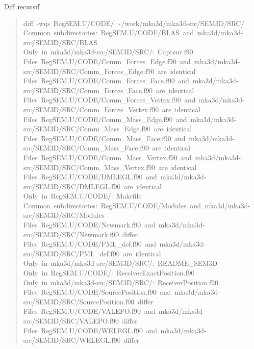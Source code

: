\documentclass[10pt,a4paper,english]{article}
\begin{document}
Diff recursif
\begin{quote}{\ttfamily \raggedright \noindent
diff~-wqs~RegSEM.U/CODE/~{\textasciitilde}/work/mka3d/mka3d-src/SEM3D/SRC/~\\
Common~subdirectories:~RegSEM.U/CODE/BLAS~and~mka3d/mka3d-src/SEM3D/SRC/BLAS~\\
Only~in~mka3d/mka3d-src/SEM3D/SRC/:~Capteur.f90~\\
Files~RegSEM.U/CODE/Comm{\_}Forces{\_}Edge.f90~and~mka3d/mka3d-src/SEM3D/SRC/Comm{\_}Forces{\_}Edge.f90~are~identical~\\
Files~RegSEM.U/CODE/Comm{\_}Forces{\_}Face.f90~and~mka3d/mka3d-src/SEM3D/SRC/Comm{\_}Forces{\_}Face.f90~are~identical~\\
Files~RegSEM.U/CODE/Comm{\_}Forces{\_}Vertex.f90~and~mka3d/mka3d-src/SEM3D/SRC/Comm{\_}Forces{\_}Vertex.f90~are~identical~\\
Files~RegSEM.U/CODE/Comm{\_}Mass{\_}Edge.f90~and~mka3d/mka3d-src/SEM3D/SRC/Comm{\_}Mass{\_}Edge.f90~are~identical~\\
Files~RegSEM.U/CODE/Comm{\_}Mass{\_}Face.f90~and~mka3d/mka3d-src/SEM3D/SRC/Comm{\_}Mass{\_}Face.f90~are~identical~\\
Files~RegSEM.U/CODE/Comm{\_}Mass{\_}Vertex.f90~and~mka3d/mka3d-src/SEM3D/SRC/Comm{\_}Mass{\_}Vertex.f90~are~identical~\\
Files~RegSEM.U/CODE/DMLEGL.f90~and~mka3d/mka3d-src/SEM3D/SRC/DMLEGL.f90~are~identical~\\
Only~in~RegSEM.U/CODE/:~Makefile~\\
Common~subdirectories:~RegSEM.U/CODE/Modules~and~mka3d/mka3d-src/SEM3D/SRC/Modules~\\
Files~RegSEM.U/CODE/Newmark.f90~and~mka3d/mka3d-src/SEM3D/SRC/Newmark.f90~differ~\\
Files~RegSEM.U/CODE/PML{\_}def.f90~and~mka3d/mka3d-src/SEM3D/SRC/PML{\_}def.f90~are~identical~\\
Only~in~mka3d/mka3d-src/SEM3D/SRC/:~README{\_}SEM3D~\\
Only~in~RegSEM.U/CODE/:~ReceiverExactPosition.f90~\\
Only~in~mka3d/mka3d-src/SEM3D/SRC/:~ReceiverPosition.f90~\\
Files~RegSEM.U/CODE/SourcePosition.f90~and~mka3d/mka3d-src/SEM3D/SRC/SourcePosition.f90~differ~\\
Files~RegSEM.U/CODE/VALEPO.f90~and~mka3d/mka3d-src/SEM3D/SRC/VALEPO.f90~differ~\\
Files~RegSEM.U/CODE/WELEGL.f90~and~mka3d/mka3d-src/SEM3D/SRC/WELEGL.f90~differ~\\
}
\end{quote}
\end{document}
